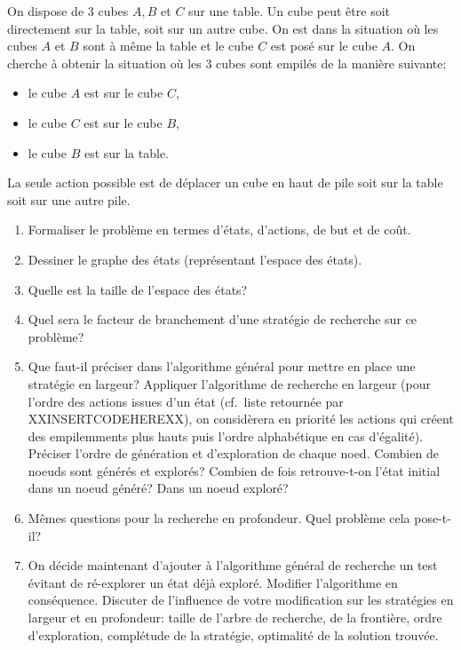 \begin{td-exo}[] %
	On dispose de 3 cubes \(A, B\) et \(C\) sur une table. Un cube peut être soit
	directement sur la table, soit sur un autre cube. On est dans la situation où
	les cubes \(A\) et \(B\) sont à même la table et le cube \(C\) est posé sur 
	le cube \(A\). On cherche à obtenir la situation où les 3 cubes sont empilés
	de la manière suivante: 
	\begin{itemize}
		\item le cube \(A\) est sur le cube \(C\),
		\item le cube \(C\) est sur le cube \(B\),
		\item le cube \(B\) est sur la table.
	\end{itemize}
	La seule action possible est de déplacer un cube en haut de pile soit sur la 
	table soit sur une autre pile.

	\begin{enumerate}
		\item Formaliser le problème en termes d'états, d'actions, de but et de coût.

		\item Dessiner le graphe des états (représentant l'espace des états).

		\item Quelle est la taille de l'espace des états?

		\item Quel sera le facteur de branchement d'une stratégie de recherche sur
		ce problème?

		\item Que faut-il préciser dans l'algorithme général pour mettre en place 
		une stratégie en largeur? Appliquer l'algorithme de recherche en largeur (pour
		l'ordre des actions issues d'un état (cf.\ liste retournée par XXINSERTCODEHEREXX), %
		on considèrera en priorité les actions qui créent des empilemments plus hauts
		puis l'ordre alphabétique en cas d'égalité). Préciser l'ordre de génération et 
		d'exploration de chaque noed. Combien de noeuds sont générés et explorés? Combien
		de fois retrouve-t-on l'état initial dans un noeud généré? Dans un noeud exploré?

		\item Mêmes questions pour la recherche en profondeur. Quel problème cela pose-t-il?

		\item On décide maintenant d'ajouter à l'algorithme général de recherche un test 
		évitant de ré-explorer un état déjà exploré. Modifier l'algorithme en conséquence.
		Discuter de l'influence de votre modification sur les stratégies en largeur et en profondeur:
		taille de l'arbre de recherche, de la frontière, ordre d'exploration, complétude de la
		stratégie, optimalité de la solution trouvée.


\end{enumerate}
\end{td-exo}
